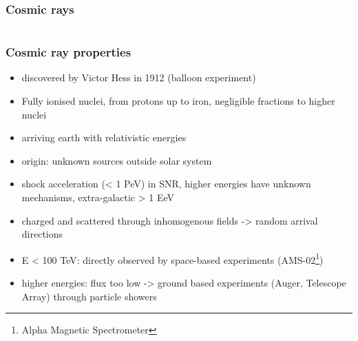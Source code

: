 \documentclass[aspectratio=1610, 9pt]{beamer}
\begin{document}
\begin{frame}\frametitle{Cosmic rays}
  \begin{columns}
  \end{columns}
\end{frame}

\begin{frame}\frametitle{Cosmic ray properties}
  \begin{itemize}
    \item discovered by Victor Hess in 1912 (balloon experiment)
    \item Fully ionised nuclei, from protons up to iron, negligible fractions
    to higher nuclei
    \item arriving earth with relativistic energies
    \item origin: unknown sources outside solar system
    \item shock acceleration (< 1 PeV) in SNR, higher energies have unknown
    mechanisms, extra-galactic > 1 EeV
    \item charged and scattered through inhomogenous fields -> random arrival directions
    \item E < 100 TeV: directly observed by space-based experiments (AMS-02\footnote{Alpha Magnetic Spectrometer})
    \item higher energies: flux too low -> ground based experiments
    (Auger, Telescope Array) through particle showers
  \end{itemize}
\end{frame}
\end{document}
